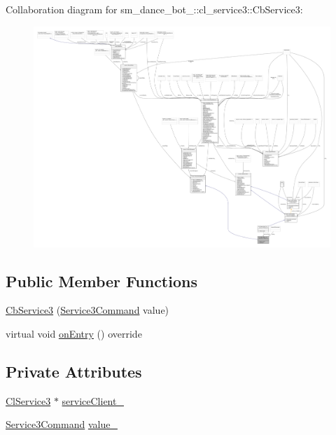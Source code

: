 Collaboration diagram for sm\+\_\+dance\+\_\+bot\+\_\+:\+:cl\+\_\+service3\+:\+:Cb\+Service3\+:
\nopagebreak
\begin{figure}[H]
\begin{center}
\leavevmode
\includegraphics[width=350pt]{classsm__dance__bot__2_1_1cl__service3_1_1CbService3__coll__graph}
\end{center}
\end{figure}
\subsection*{Public Member Functions}
\begin{DoxyCompactItemize}
\item 
\hyperlink{classsm__dance__bot__2_1_1cl__service3_1_1CbService3_a62be950b5107ee476814a27b99e6743c}{Cb\+Service3} (\hyperlink{namespacesm__dance__bot__2_1_1cl__service3_adfc3ce70a327b24b4fb6d6b02803caff}{Service3\+Command} value)
\item 
virtual void \hyperlink{classsm__dance__bot__2_1_1cl__service3_1_1CbService3_a179e43cc240f53f9c49c67094e41d75f}{on\+Entry} () override
\end{DoxyCompactItemize}
\subsection*{Private Attributes}
\begin{DoxyCompactItemize}
\item 
\hyperlink{classsm__dance__bot__2_1_1cl__service3_1_1ClService3}{Cl\+Service3} $\ast$ \hyperlink{classsm__dance__bot__2_1_1cl__service3_1_1CbService3_ac5fafa2528bba4c7411816dde044c48a}{service\+Client\+\_\+}
\item 
\hyperlink{namespacesm__dance__bot__2_1_1cl__service3_adfc3ce70a327b24b4fb6d6b02803caff}{Service3\+Command} \hyperlink{classsm__dance__bot__2_1_1cl__service3_1_1CbService3_ae48a64bc675b548fcb9c059831e39e37}{value\+\_\+}
\end{DoxyCompactItemize}


